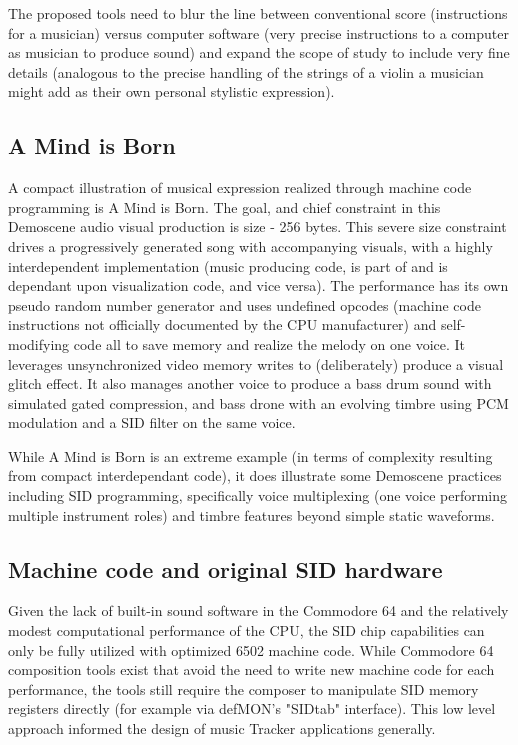 \documentclass[10pt]{article}
\begin{document}
\begin{multicols*}{2}
The proposed tools need to blur the line between conventional score (instructions for a musician) versus computer software (very precise instructions to a computer as musician to produce sound) and expand the scope of study to include very fine details (analogous to the precise handling of the strings of a violin a musician might add as their own personal stylistic expression).

\subsection{A Mind is Born}
\label{amib}

A compact illustration of musical expression realized through machine code programming is A Mind is Born\cite{amib}. The goal, and chief constraint in this Demoscene audio visual production is size - 256 bytes. This severe size constraint drives a progressively generated song with accompanying visuals, with a highly interdependent implementation (music producing code, is part of and is dependant upon visualization code, and vice versa). The performance has its own pseudo random number generator and uses undefined opcodes (machine code instructions not officially documented by the CPU manufacturer) and self-modifying code all to save memory and realize the melody on one voice. It leverages unsynchronized video memory writes to (deliberately) produce a visual glitch effect. It also manages another voice to produce a bass drum sound with simulated gated compression, and bass drone with an evolving timbre using PCM modulation and a SID filter on the same voice.

While A Mind is Born is an extreme example (in terms of complexity resulting from compact interdependant code), it does illustrate some Demoscene practices including SID programming, specifically voice multiplexing (one voice performing multiple instrument roles) and timbre features beyond simple static waveforms.

\subsection{Machine code and original SID hardware}

Given the lack of built-in sound software in the Commodore 64 and the relatively modest computational performance of the CPU, the SID chip capabilities can only be fully utilized with optimized 6502 machine code\cite{c64digi}. While Commodore 64 composition tools exist that avoid the need to write new machine code for each performance, the tools still require the composer to manipulate SID memory registers directly (for example via defMON's\cite{defmon} "SIDtab" interface). This low level approach informed the design of music Tracker applications generally\cite{trackers}.


\end{multicols*}
\end{document}
